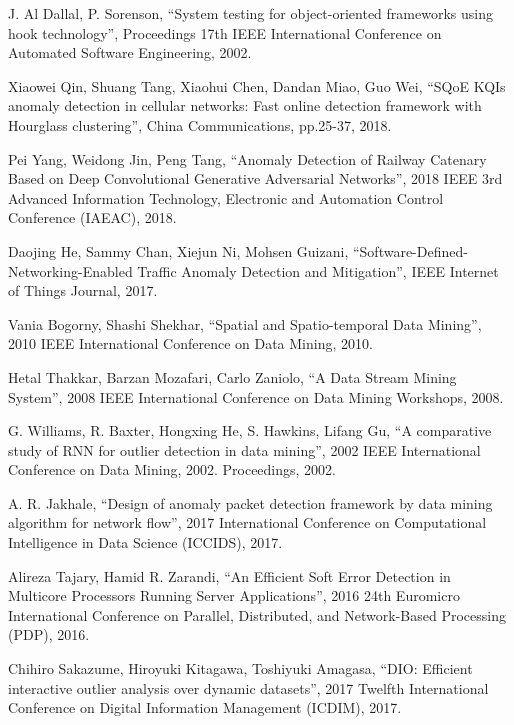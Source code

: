 \begin{thebibliography}{99}

		J. Al Dallal, P. Sorenson, “System testing for object-oriented frameworks using hook technology”, Proceedings 17th IEEE International Conference on Automated Software Engineering, 2002.
		
		Xiaowei Qin, Shuang Tang, Xiaohui Chen, Dandan Miao, Guo Wei, “SQoE KQIs anomaly detection in cellular networks: Fast online detection framework with Hourglass clustering”, China Communications, pp.25-37, 2018.
		
		Pei Yang, Weidong Jin, Peng Tang, “Anomaly Detection of Railway Catenary Based on Deep Convolutional Generative Adversarial Networks”, 2018 IEEE 3rd Advanced Information Technology, Electronic and Automation Control Conference (IAEAC), 2018.
				
		Daojing He, Sammy Chan, Xiejun Ni, Mohsen Guizani, “Software-Defined-Networking-Enabled Traffic Anomaly Detection and Mitigation”, IEEE Internet of Things Journal, 2017.
		
		Vania Bogorny, Shashi Shekhar, “Spatial and Spatio-temporal Data Mining”, 2010 IEEE International Conference on Data Mining, 2010.
		
		Hetal Thakkar, Barzan Mozafari, Carlo Zaniolo, “A Data Stream Mining System”, 2008 IEEE International Conference on Data Mining Workshops, 2008.

		G. Williams, R. Baxter, Hongxing He, S. Hawkins, Lifang Gu, “A comparative study of RNN for outlier detection in data mining”, 2002 IEEE International Conference on Data Mining, 2002. Proceedings, 2002.
		
		A. R. Jakhale, “Design of anomaly packet detection framework by data mining algorithm for network flow”, 2017 International Conference on Computational Intelligence in Data Science (ICCIDS), 2017.
		
		Alireza Tajary, Hamid R. Zarandi, “An Efficient Soft Error Detection in Multicore Processors Running Server Applications”, 2016 24th Euromicro International Conference on Parallel, Distributed, and Network-Based Processing (PDP), 2016.
		
		Chihiro Sakazume, Hiroyuki Kitagawa, Toshiyuki Amagasa, “DIO: Efficient interactive outlier analysis over dynamic datasets”, 2017 Twelfth International Conference on Digital Information Management (ICDIM), 2017.


\end{thebibliography}
